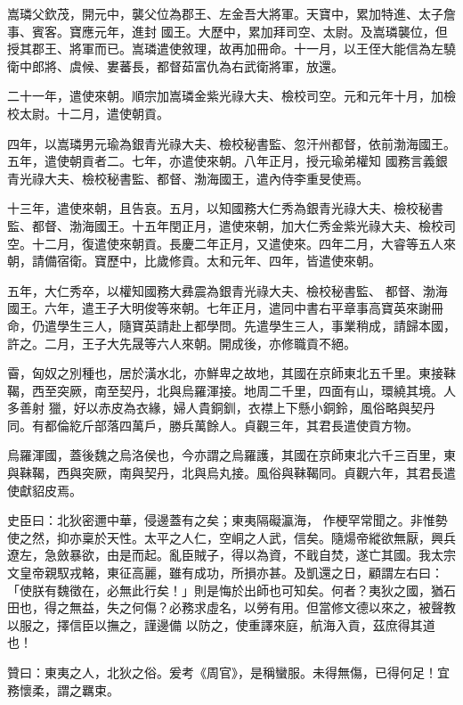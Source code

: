 \begin{pinyinscope}
 嵩璘父欽茂，開元中，襲父位為郡王、左金吾大將軍。天寶中，累加特進、太子詹事、賓客。寶應元年，進封
 國王。大歷中，累加拜司空、太尉。及嵩璘襲位，但授其郡王、將軍而已。嵩璘遣使敘理，故再加冊命。十一月，以王侄大能信為左驍衛中郎將、虞候、婁蕃長，都督茹富仇為右武衛將軍，放還。



 二十一年，遣使來朝。順宗加嵩璘金紫光祿大夫、檢校司空。元和元年十月，加檢校太尉。十二月，遣使朝貢。



 四年，以嵩璘男元瑜為銀青光祿大夫、檢校秘書監、忽汗州都督，依前渤海國王。五年，遣使朝貢者二。七年，亦遣使來朝。八年正月，授元瑜弟權知
 國務言義銀青光祿大夫、檢校秘書監、都督、渤海國王，遣內侍李重旻使焉。



 十三年，遣使來朝，且告哀。五月，以知國務大仁秀為銀青光祿大夫、檢校秘書監、都督、渤海國王。十五年閏正月，遣使來朝，加大仁秀金紫光祿大夫、檢校司空。十二月，復遣使來朝貢。長慶二年正月，又遣使來。四年二月，大睿等五人來朝，請備宿衛。寶歷中，比歲修貢。太和元年、四年，皆遣使來朝。



 五年，大仁秀卒，以權知國務大彞震為銀青光祿大夫、檢校秘書監、
 都督、渤海國王。六年，遣王子大明俊等來朝。七年正月，遣同中書右平章事高寶英來謝冊命，仍遣學生三人，隨寶英請赴上都學問。先遣學生三人，事業稍成，請歸本國，許之。二月，王子大先晟等六人來朝。開成後，亦修職貢不絕。



 霫，匈奴之別種也，居於潢水北，亦鮮卑之故地，其國在京師東北五千里。東接靺鞨，西至突厥，南至契丹，北與烏羅渾接。地周二千里，四面有山，環繞其境。人多善射
 獵，好以赤皮為衣緣，婦人貴銅釧，衣襟上下懸小銅鈴，風俗略與契丹同。有都倫紇斤部落四萬戶，勝兵萬餘人。貞觀三年，其君長遣使貢方物。



 烏羅渾國，蓋後魏之烏洛侯也，今亦謂之烏羅護，其國在京師東北六千三百里，東與靺鞨，西與突厥，南與契丹，北與烏丸接。風俗與靺鞨同。貞觀六年，其君長遣使獻貂皮焉。



 史臣曰：北狄密邇中華，侵邊蓋有之矣；東夷隔礙瀛海，
 作梗罕常聞之。非惟勢使之然，抑亦稟於天性。太平之人仁，空峒之人武，信矣。隨煬帝縱欲無厭，興兵遼左，急斂暴欲，由是而起。亂臣賊子，得以為資，不戢自焚，遂亡其國。我太宗文皇帝親馭戎輅，東征高麗，雖有成功，所損亦甚。及凱還之日，顧謂左右曰：「使朕有魏徵在，必無此行矣！」則是悔於出師也可知矣。何者？夷狄之國，猶石田也，得之無益，失之何傷？必務求虛名，以勞有用。但當修文德以來之，被聲教以服之，擇信臣以撫之，謹邊備
 以防之，使重譯來庭，航海入貢，茲庶得其道也！



 贊曰：東夷之人，北狄之俗。爰考《周官》，是稱蠻服。未得無傷，已得何足！宜務懷柔，謂之羈束。



\end{pinyinscope}